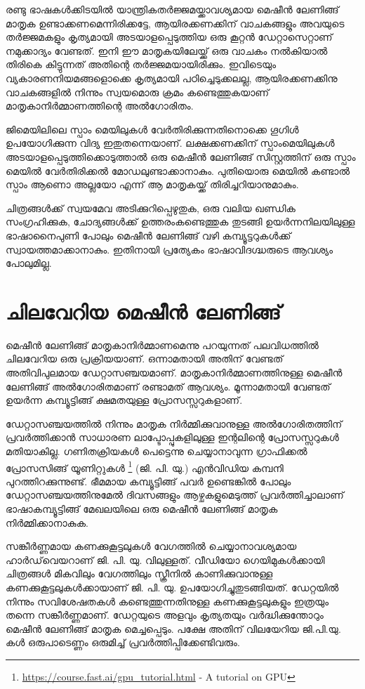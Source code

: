 \documentclass[12pt,twoside,a4paper]{article}
\begin{document}
രണ്ടു ഭാഷകൾക്കിടയിൽ യാന്ത്രികതർജ്ജമയ്ക്കാവശ്യമായ മെഷീൻ ലേണിങ്ങ് മാതൃക ഉണ്ടാക്കണമെന്നിരിക്കട്ടേ, ആയിരക്കണക്കിന് വാചകങ്ങളും അവയുടെ തർജ്ജമകളും കൃത്യമായി അടയാളപ്പെടുത്തിയ ഒരു കൂറ്റൻ ഡേറ്റാസെറ്റാണ് നമുക്കാദ്യം വേണ്ടത്. ഇനി ഈ മാതൃകയിലേയ്ക്ക്  ഒരു വാചകം നൽകിയാൽ തിരികെ കിട്ടുന്നത് അതിന്റെ തർജ്ജമയായിരിക്കും. ഇവിടെയും വ്യകാരണനിയമങ്ങളൊക്കെ കൃത്യമായി പഠിച്ചെടുക്കലല്ല, ആയിരക്കണക്കിനു വാചകങ്ങളിൽ നിന്നും സ്വയമൊരു ക്രമം കണ്ടെത്തുകയാണ് മാതൃകാനിർമ്മാണത്തിന്റെ അൽഗോരിതം.

ജിമെയിലിലെ സ്പാം മെയിലുകൾ വേർതിരിക്കുന്നതിനൊക്കെ ഗൂഗിൾ ഉപയോഗിക്കുന്ന വിദ്യ ഇതുതന്നെയാണ്. ലക്ഷക്കണക്കിന് സ്പാംമെയിലുകൾ അടയാളപ്പെടുത്തിക്കൊടുത്താൽ ഒരു മെഷീൻ ലേണിങ്ങ് സിസ്റ്റത്തിന് ഒരു സ്പാം മെയിൽ വേർതിരിക്കൽ മോഡലുണ്ടാക്കാനാകും. പുതിയൊരു മെയിൽ കണ്ടാൽ സ്പാം ആണൊ അല്ലയോ എന്ന് ആ മാതൃകയ്ക്ക് തിരിച്ചറിയാനുമാകും.

ചിത്രങ്ങൾക്ക് സ്വയമേവ അടിക്കുറിപ്പെഴുതുക, ഒരു വലിയ ഖണ്ഡിക സംഗ്രഹിക്കുക, ചോദ്യങ്ങൾക്ക് ഉത്തരംകണ്ടെത്തുക തുടങ്ങി ഉയർന്നനിലയിലുള്ള ഭാഷാനൈപുണി പോലും മെഷീൻ ലേണിങ്ങ് വഴി കമ്പ്യൂട്ടറുകൾക്ക് സ്വായത്തമാക്കാനാകും. ഇതിനായി പ്രത്യേകം ഭാഷാവിദഗ്ദ്ധരുടെ ആവശ്യം പോലുമില്ല.

\section{ചിലവേറിയ മെഷീൻ ലേണിങ്ങ്}

മെഷീൻ ലേണിങ്ങ് മാതൃകാനിർമ്മാണമെന്നു പറയുന്നത് പലവിധത്തിൽ ചിലവേറിയ ഒരു പ്രക്രിയയാണ്. ഒന്നാമതായി അതിന് വേണ്ടത് അതിവിപുലമായ ഡേറ്റാസഞ്ചയമാണ്. മാതൃകാനിർമ്മാണത്തിനുള്ള മെഷീൻ ലേണിങ്ങ് അൽഗോരിതമാണ് രണ്ടാമത് ആവശ്യം. മൂന്നാമതായി വേണ്ടത് ഉയർന്ന കമ്പ്യൂട്ടിങ്ങ് ക്ഷമതയുള്ള പ്രോസസ്സറുകളാണ്.

ഡേറ്റാസഞ്ചയത്തിൽ നിന്നും മാതൃക നിർമ്മിക്കുവാനുള്ള അൽഗോരിതത്തിന് പ്രവർത്തിക്കാൻ സാധാരണ ലാപ്ടോപ്പുകളിലുള്ള ഇന്റലിന്റെ പ്രോസസ്സറുകൾ മതിയാകില്ല. ഗണിതക്രിയകൾ പെട്ടെന്നു ചെയ്യാനാവുന്ന ഗ്രാഫിക്കൽ പ്രോസസിങ്ങ് യൂണിറ്റുകൾ \footnote{\url{https://course.fast.ai/gpu_tutorial.html} - {A tutorial on GPU}} (ജി. പി. യു.) എൻവിഡിയ കമ്പനി പുറത്തിറക്കുന്നുണ്ട്. ഭീമമായ കമ്പ്യൂട്ടിങ്ങ് പവർ ഉണ്ടെങ്കിൽ പോലും ഡേറ്റാസഞ്ചയത്തിനുമേൽ ദിവസങ്ങളും ആഴ്ചകളുമെടുത്ത് പ്രവർത്തിച്ചാലാണ് ഭാഷാകമ്പ്യൂട്ടിങ്ങ് മേഖലയിലെ ഒരു മെഷീൻ ലേണിങ്ങ് മാതൃക നിർമ്മിക്കാനാകുക.

സങ്കീർണ്ണമായ കണക്കുകൂട്ടലുകൾ വേഗത്തിൽ ചെയ്യാനാവശ്യമായ ഹാർഡ്‌വെയറാണ് ജി. പി. യു. വിലുള്ളത്. വീഡിയോ ഗെയിമുകൾക്കായി ചിത്രങ്ങൾ മികവിലും വേഗത്തിലും സ്ക്രീനിൽ കാണിക്കുവാനുള്ള കണക്കുകൂട്ടലുകൾക്കായാണ് ജി. പി. യു. ഉപയോഗിച്ചുതുടങ്ങിയത്. ഡേറ്റയിൽ നിന്നും സവിശേഷതകൾ കണ്ടെത്തുന്നതിനുള്ള കണക്കുകൂട്ടലുകളും ഇത്രയും തന്നെ സങ്കീർണ്ണമാണ്. ഡേറ്റയുടെ അളവും കൃത്യതയും വർദ്ധിക്കുന്തോറും മെഷീൻ ലേണിങ്ങ് മാതൃക മെച്ചപ്പെടും. പക്ഷേ അതിന് വിലയേറിയ ജി.പി.യു. കൾ ഒരുപാടെണ്ണം ഒരുമിച്ച് പ്രവർത്തിപ്പിക്കേണ്ടിവരും.
\end{document}
